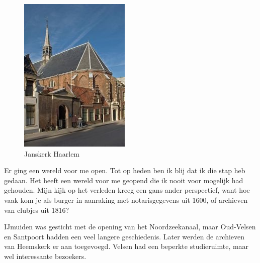 \documentclass[10pt,twoside, openright]{memoir}
\begin{document}
\begin{figure}
\includegraphics[width=\textwidth]{img/ch47/kerk}
\caption*{\footnotesize Janskerk Haarlem}
\end{figure}

Er ging een wereld voor me open. Tot op heden ben ik blij dat ik die stap heb gedaan. Het heeft een wereld voor me geopend die ik nooit voor mogelijk had gehouden. Mijn kijk op het verleden kreeg een gans ander perspectief, want hoe vaak kom je als burger in aanraking met notarisgegevens uit 1600, of archieven van clubjes uit 1816?

IJmuiden was gesticht met de opening van het Noordzeekanaal, maar Oud-Velsen en Santpoort hadden een veel langere geschiedenis. Later werden de archieven van Heemskerk er aan toegevoegd. Velsen had een beperkte studieruimte, maar wel interessante bezoekers. 
\end{document}

